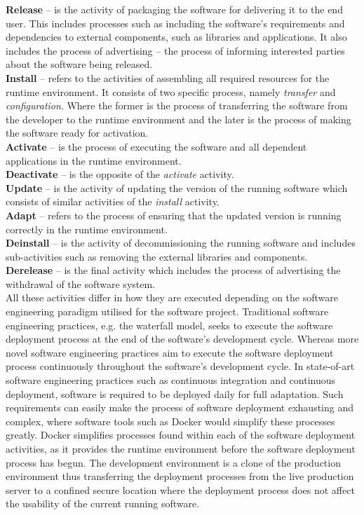 \textbf{Release} – is the activity of packaging the software for delivering it to the end user. This includes processes such as including the software's requirements and dependencies to external components, such as libraries and applications. It also includes the process of advertising – the process of informing interested parties about the software being released.\\
\textbf{Install} – refers to the activities of assembling all required resources for the runtime environment. It consists of two specific process, namely \textit{transfer} and \textit{configuration}. Where the former is the process of transferring the software from the developer to the runtime environment and the later is the process of making the software ready for activation.\\
\textbf{Activate} – is the process of executing the software and all dependent applications in the runtime environment.\\
\textbf{Deactivate} – is the opposite of the \textit{activate} activity.\\
\textbf{Update} – is the activity of updating the version of the running software which consists of similar activities of the \textit{install} activity.\\
\textbf{Adapt} – refers to the process of ensuring that the updated version is running correctly in the runtime environment.\\
\textbf{Deinstall} – is the activity of decommissioning the running software and includes sub-activities such as removing the external libraries and components.\\
\textbf{Derelease} – is the final activity which includes the process of advertising the withdrawal of the software system.\\

All these activities differ in how they are executed depending on the software engineering paradigm utilised for the software project. Traditional software engineering practices, e.g. the waterfall model, seeks to execute the software deployment process at the end of the software's development cycle. Whereas more novel software engineering practices aim to execute the software deployment process continuously throughout the software's development cycle. In state-of-art software engineering practices such as continuous integration and continuous deployment, software is required to be deployed daily \cite{meyer2014continuous} for full adaptation. Such requirements can easily make the process of software deployment exhausting and complex, where software tools such as Docker would simplify these processes greatly. Docker simplifies processes found within each of the software deployment activities, as it provides the runtime environment before the software deployment process has begun. The development environment is a clone of the production environment thus transferring the deployment processes from the live production server to a confined secure location where the deployment process does not affect the usability of the current running software.\\


